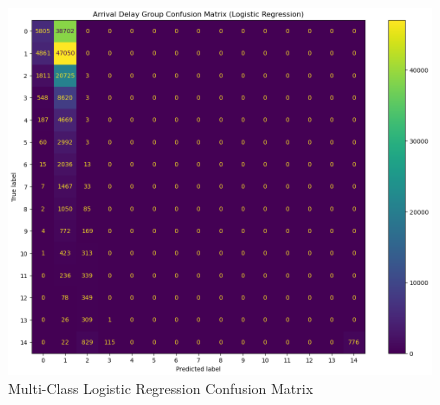 \documentclass[a4paper,12pt]{article}
\begin{document}
\begin{figure}[!]
    \centering
    \includegraphics*[scale=.50]{../../img/model_rq1_cfmtrx_2.png}
    \caption[]{Multi-Class Logistic Regression Confusion Matrix}
    \label{fig:model:rq1:cfmtrx_2}
\end{figure}
\end{document}
